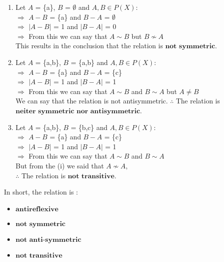 \documentclass{article}
\begin{document}
\begin{enumerate}
\begin{multicols}{2}
\begin{enumerate}
\begin{enumerate}
            \item Let $A$ = \{a\}, $B$ = $\emptyset$ and $A,B \in P(X)$:\\
                $\Rightarrow$ $A-B$ = \{a\} and $B-A$ = $\emptyset$\\
                $\Rightarrow$ $\left\lvert A - B\right\rvert$ = 1 and $\left\lvert B - A\right\rvert$ = 0\\
                $\Rightarrow$ From this we can say that $A \sim B$ but $B \nsim A$\\
                This results in the conclusion that the relation is $\textbf{not symmetric}$.\\

            \item Let $A$ = \{a,b\}, $B$ = \{a,b\} and $A,B \in P(X)$:\\
                $\Rightarrow$ $A-B$ = \{a\} and $B-A$ = \{c\} \\
                $\Rightarrow$ $\left\lvert A - B\right\rvert$ = 1 and $\left\lvert B - A\right\rvert$ = 1\\
                $\Rightarrow$ From this we can say that $A \sim B$ and $B \sim A$ but $A \neq B$\\
                We can say that the relation is not antisymmetric. $\therefore$ The relation is 
                $\textbf{neiter symmetric nor antisymmetric}$.\\

            \item Let $A$ = \{a,b\}, $B$ = \{b,c\} and $A,B \in P(X)$:\\
                $\Rightarrow$ $A-B$ = \{a\} and $B-A$ = \{c\} \\
                $\Rightarrow$ $\left\lvert A - B\right\rvert$ = 1 and $\left\lvert B - A\right\rvert$ = 1\\
                $\Rightarrow$ From this we can say that $A \sim B$ and $B \sim A$\\
                But from the (i) we said that $A \nsim A$,\\ $\therefore$ The relation is $\textbf{not transitive}$.
        \end{enumerate}

    In short, the relation is :
    \begin{itemize}
        \item $\textbf{antireflexive}$
        \item $\textbf{not symmetric}$
        \item $\textbf{not anti-symmetric}$
        \item $\textbf{not transitive}$
    \end{itemize}
    

\end{enumerate}
\end{multicols}
\end{enumerate}
\end{document}
